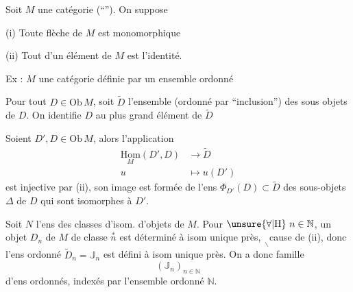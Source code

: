 
Soit \(M\) une catégorie (``''). On suppose

(i) Toute flèche de \(M\) est monomorphique

(ii) Tout  d'un élément de \(M\) est l'identité.

Ex : \(M\) une catégorie définie par un ensemble ordonné

Pour tout \(D\in\mathrm{Ob}\,M\), soit \(\widetilde D\) l'ensemble (ordonné par ``inclusion'') des sous objets de \(D\). On identifie \(D\) au plus grand élément de \(\widetilde D\)

Soient \(D',D\in\mathrm{Ob}\,M\), alors l'application
\begingroup\makeatletter\tagsleft@true\makeatother
\[
\begin{aligned}
\underset{M}{\mathrm{Hom}}(D',D)&\longrightarrow\widetilde D\\
u&\longmapsto u(D')
\end{aligned}
\tag*{(\(\ast\))}
\]
\endgroup
est injective par \unsure{(i]|(i)|[i]}(ii), son image est formée de l'ens 
\(\Phi_{D'}(D)\subset\widetilde D\)
des sous-objets \(\Delta\) de \(D\) qui sont isomorphes à \(D'\).


Soit \(N\) l'ens  des classes d'isom. d'objets de \(M\). 
Pour \(\unsure{\forall|\mathrm H}\ n\in\mathbb N\), un objet \(D_n\) de \(M\) de classe \(\overset{\ast}{n}\) est déterminé à isom unique près, \(\underset{\scriptscriptstyle\backslash}{\phantom{x}}\)cause de (ii), donc l'ens ordonné \(\widetilde D_n=\mathbb J_n\) est défini à isom unique près. On a donc  famille
\[
(\mathbb J_n)_{n\in\mathbb N}
\]
d'ens ordonnés, indexés par l'ensemble ordonné \(\mathbb N\).
